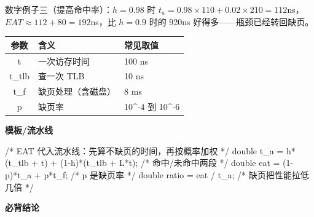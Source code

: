 \documentclass[10pt,a4paper]{ctexart}
\begin{document}
数字例子三（提高命中率）：$h=0.98$ 时 $t_a=0.98\times 110+0.02\times 210=112$ns，$EAT\approx 112+80=192$ns，比 $h=0.9$ 时的 920ns 好得多——瓶颈已经转回缺页。

\begin{center}\small
\begin{tabularx}{\linewidth}{@{}c>{\raggedright\arraybackslash}Xl@{}}
\toprule
参数 & 含义 & 常见取值 \\
\midrule
t & 一次访存时间 & 100 ns \\
t\_tlb & 查一次 TLB & 10 ns \\
t\_f & 缺页处理（含磁盘） & 8 ms \\
p & 缺页率 & 10\textasciicircum{}-4 到 10\textasciicircum{}-6 \\
\bottomrule
\end{tabularx}
\end{center}

\textbf{模板/流水线}

\begin{codebox}
/* EAT 代入流水线：先算不缺页的时间，再按概率加权 */
double t_a = h*(t_tlb + t) + (1-h)*(t_tlb + L*t);  /* 命中/未命中两段 */
double eat = (1-p)*t_a + p*t_f;                    /* p 是缺页率 */
double ratio = eat / t_a;                          /* 缺页把性能拉低几倍 */
\end{codebox}




\textbf{必背结论}
\end{document}
